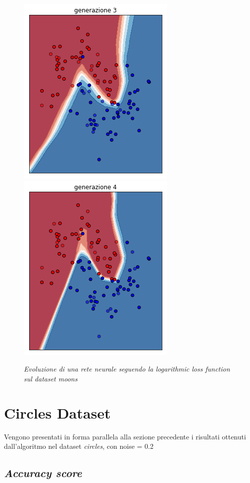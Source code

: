 \documentclass[12pt,a4paper]{report}
\begin{document}
\begin{figure}[H]
 \includegraphics[scale = 0.35]{images/moons-rnd-log./3}
 \includegraphics[scale = 0.35]{images/moons-rnd-log./4}
 \caption{\textit{Evoluzione di una rete neurale seguendo la logarithmic loss function sul dataset moons}}
 \label{moons3}
\end{figure}

\section{Circles Dataset}

Vengono presentati in forma parallela alla sezione precedente i risultati ottenuti dall'algoritmo nel dataset \textit{circles}, con noise = 0.2

\subsection{\textit{Accuracy score}}
\end{document}
